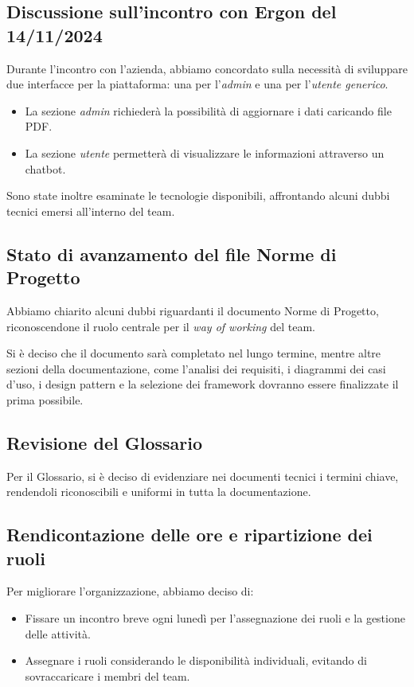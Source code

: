 \documentclass{article}
\begin{document}
\subsection{Discussione sull'incontro con Ergon del 14/11/2024} 
Durante l'incontro con l'azienda, abbiamo concordato sulla necessità di sviluppare due interfacce per la piattaforma: una per l'\textit{admin} e una per l'\textit{utente generico}.
\begin{itemize}
    \item La sezione \textit{admin} richiederà la possibilità di aggiornare i dati caricando file PDF.
    \item La sezione \textit{utente} permetterà di visualizzare le informazioni attraverso un chatbot.
\end{itemize}
Sono state inoltre esaminate le tecnologie disponibili, affrontando alcuni dubbi tecnici emersi all'interno del team.

\subsection{Stato di avanzamento del file Norme di Progetto} 
Abbiamo chiarito alcuni dubbi riguardanti il documento Norme di Progetto, riconoscendone il ruolo centrale per il \textit{way of working} del team.

Si è deciso che il documento sarà completato nel lungo termine, mentre altre sezioni della documentazione, come l'analisi dei requisiti, i diagrammi dei casi d'uso, i design pattern e la selezione dei framework dovranno essere finalizzate il prima possibile.

\subsection{Revisione del Glossario} 
Per il Glossario, si è deciso di evidenziare nei documenti tecnici i termini chiave, rendendoli riconoscibili e uniformi in tutta la documentazione.

\subsection{Rendicontazione delle ore e ripartizione dei ruoli} 
Per migliorare l'organizzazione, abbiamo deciso di:
\begin{itemize}
    \item Fissare un incontro breve ogni lunedì per l'assegnazione dei ruoli e la gestione delle attività.
    \item Assegnare i ruoli considerando le disponibilità individuali, evitando di sovraccaricare i membri del team.
\end{itemize}
\end{document}
